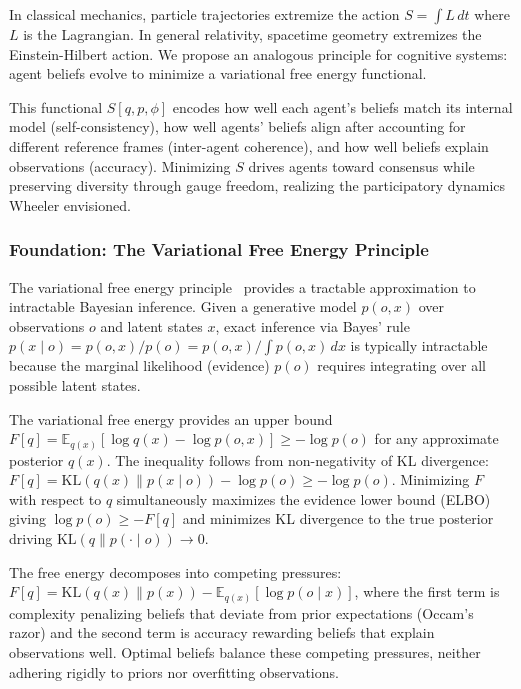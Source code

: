 \documentclass[11pt]{article}
\begin{document}
In classical mechanics, particle trajectories extremize the action $S = \int L \, dt$ where $L$ is the Lagrangian. In general relativity, spacetime geometry extremizes the Einstein-Hilbert action. We propose an analogous principle for cognitive systems: agent beliefs evolve to minimize a variational free energy functional.

This functional $S[q, p, \phi]$ encodes how well each agent's beliefs match its internal model (self-consistency), how well agents' beliefs align after accounting for different reference frames (inter-agent coherence), and how well beliefs explain observations (accuracy). Minimizing $S$ drives agents toward consensus while preserving diversity through gauge freedom, realizing the participatory dynamics Wheeler envisioned.

\subsubsection{Foundation: The Variational Free Energy Principle}

The variational free energy principle~\cite{Friston2010,Parr2022} provides a tractable approximation to intractable Bayesian inference. Given a generative model $p(o, x)$ over observations $o$ and latent states $x$, exact inference via Bayes' rule $p(x \mid o) = p(o, x)/p(o) = p(o, x)/\int p(o, x) \, dx$ is typically intractable because the marginal likelihood (evidence) $p(o)$ requires integrating over all possible latent states.

The variational free energy provides an upper bound $F[q] = \mathbb{E}_{q(x)}[\log q(x) - \log p(o, x)] \geq -\log p(o)$ for any approximate posterior $q(x)$. The inequality follows from non-negativity of KL divergence: $F[q] = \mathrm{KL}(q(x) \| p(x \mid o)) - \log p(o) \geq -\log p(o)$. Minimizing $F$ with respect to $q$ simultaneously maximizes the evidence lower bound (ELBO) giving $\log p(o) \geq -F[q]$ and minimizes KL divergence to the true posterior driving $\mathrm{KL}(q \| p(\cdot \mid o)) \to 0$.

The free energy decomposes into competing pressures: $F[q] = \mathrm{KL}(q(x) \| p(x)) - \mathbb{E}_{q(x)}[\log p(o \mid x)]$, where the first term is complexity penalizing beliefs that deviate from prior expectations (Occam's razor) and the second term is accuracy rewarding beliefs that explain observations well. Optimal beliefs balance these competing pressures, neither adhering rigidly to priors nor overfitting observations.
\end{document}
